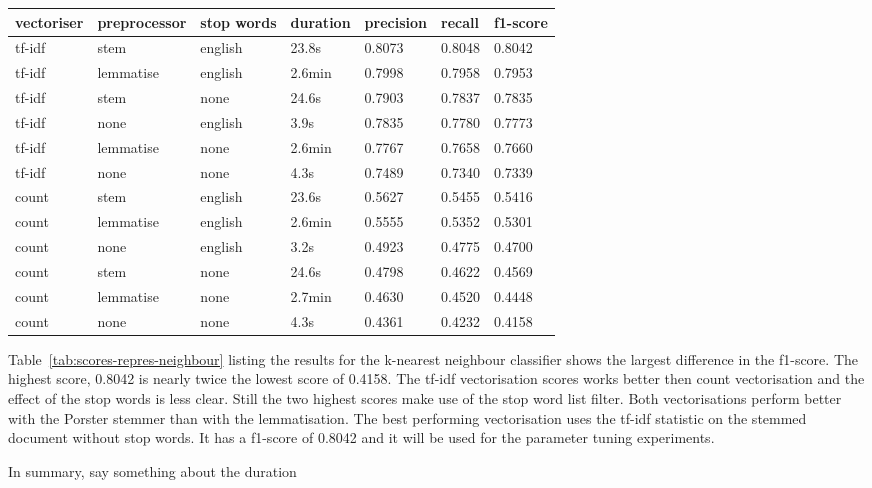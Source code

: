 \documentclass[11pt]{article}
\begin{document}
\begin{table*}[h]\footnotesize
\centering
\label{tab:scores-repres-neighbour}
\begin{tabular}{ l l l l l l l }
vectoriser & preprocessor & stop words & duration & precision & recall & f1-score \\
\hline
tf-idf & stem & english & 23.8s & 0.8073 & 0.8048 & 0.8042 \\
tf-idf & lemmatise & english & 2.6min & 0.7998 & 0.7958 & 0.7953 \\
tf-idf & stem & none & 24.6s & 0.7903 & 0.7837 & 0.7835 \\
tf-idf & none & english & 3.9s & 0.7835 & 0.7780 & 0.7773  \\
tf-idf & lemmatise & none & 2.6min & 0.7767 & 0.7658 & 0.7660 \\
tf-idf & none & none & 4.3s & 0.7489 & 0.7340 & 0.7339 \\
count & stem & english & 23.6s & 0.5627 & 0.5455 & 0.5416 \\
count & lemmatise & english & 2.6min & 0.5555 & 0.5352 & 0.5301 \\
count & none & english & 3.2s & 0.4923 & 0.4775 & 0.4700 \\
count & stem & none &  24.6s & 0.4798 & 0.4622 & 0.4569 \\
count & lemmatise & none & 2.7min & 0.4630 & 0.4520 & 0.4448 \\
count & none & none & 4.3s & 0.4361 & 0.4232 & 0.4158 \\
\end{tabular}
\caption{scores for different representations and the k-nearest neighbour classifier sorted by f1-score}
\end{table*}

Table~\ref{tab:scores-repres-neighbour} listing the results for the k-nearest neighbour classifier shows the largest difference in the f1-score. The highest score, 0.8042 is nearly twice the lowest score of 0.4158. The tf-idf vectorisation scores works better then count vectorisation and the effect of the stop words is less clear. Still the two highest scores make use of the stop word list filter. Both vectorisations perform better with the Porster stemmer than with the lemmatisation. The best performing vectorisation uses the tf-idf statistic on the stemmed document without stop words. It has a f1-score of 0.8042 and it will be used for the parameter tuning experiments.

In summary, say something about the duration
\end{document}
